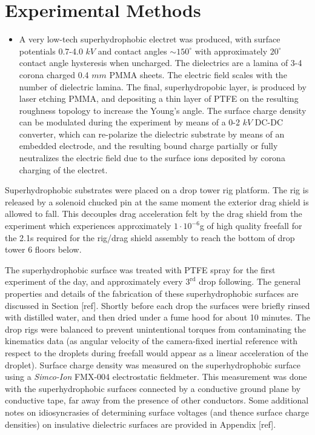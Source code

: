 \documentclass[10pt,a4paper]{article}
\begin{document}
\section{Experimental Methods}
\begin{itemize}
\item A very low-tech superhydrophobic electret was produced, with surface potentials 0.7-4.0 $kV$ and contact angles $\sim 150^{\circ}$ with approximately $20^{\circ}$ contact angle hysteresis when uncharged. The dielectrics are a lamina of 3-4 corona charged 0.4 $mm$ PMMA sheets. The electric field scales with the number of dielectric lamina. The final, superhydropobic layer, is produced by laser etching PMMA, and depositing a thin layer of PTFE on the resulting roughness topology to increase the Young's angle. The surface charge density can be modulated during the experiment by means of a 0-2 $kV$ DC-DC converter, which can re-polarize the dielectric substrate by means of an embedded electrode, and the resulting bound charge partially or fully neutralizes the electric field due to the surface ions deposited by corona charging of the electret.
\end{itemize}

Superhydrophobic substrates were placed on a drop tower rig platform. The rig is released by a solenoid chucked pin at the same moment the exterior drag shield is allowed to fall. This decouples drag acceleration felt by the drag shield from the experiment which experiences approximately $1 \cdot 10^{-6}$g of high quality freefall for the 2.1s required for the rig/drag shield assembly to reach the bottom of drop tower 6 floors below. 

The superhydrophobic surface was treated with PTFE spray for the first experiment of the day, and approximately every $3^{\mbox{rd}}$ drop following. The general properties and details of the fabrication of these superhydrophobic surfaces are discussed in Section [ref]. Shortly before each drop the surfaces were briefly rinsed with distilled water, and then dried under a fume hood for about 10 minutes. The drop rigs were balanced to prevent unintentional torques from contaminating the kinematics data (as angular velocity of the camera-fixed inertial reference with respect to the droplets during freefall would appear as a linear acceleration of the droplet). Surface charge density was measured on the superhydrophobic surface using a \emph{Simco-Ion} FMX-004 electrostatic fieldmeter. This measurement was done with the superhydrophobic surfaces connected by a conductive ground plane by conductive tape, far away from the presence of other conductors. Some additional notes on idiosyncrasies of determining surface voltages (and thence surface charge densities) on insulative dielectric surfaces are provided in Appendix [ref].
\end{document}
